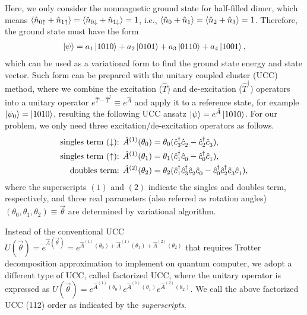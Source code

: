 Here, we only consider the nonmagnetic ground state for half-filled dimer, which means $\langle \hat{n}_{0{\uparrow}}+\hat{n}_{1{\uparrow}} \rangle = \langle \hat{n}_{0{\downarrow}}+\hat{n}_{1{\downarrow}} \rangle = 1$, i.e., $\langle \hat{n}_{0}+\hat{n}_{1} \rangle = \langle \hat{n}_{2}+\hat{n}_{3} \rangle = 1$. Therefore, the ground state must have the form
\begin{align*}
  \left\vert{\psi}\right\rangle = a_{1}\left\vert{1010}\right\rangle + a_{2}\left\vert{0101}\right\rangle + a_{3}\left\vert{0110}\right\rangle + a_{4}\left\vert{1001}\right\rangle,
\end{align*}
which can be used as a variational form to find the ground state energy and state vector. Such form can be prepared with the unitary coupled cluster (UCC) method, where we combine the excitation ($\hat{T}$) and de-excitation ($\hat{T}^\dagger$) operators into a unitary operator $e^{\hat{T} - \hat{T}^\dagger} \equiv e^{\hat{A}}$ and apply it to a reference state, for example $\left\vert{\psi_0}\right\rangle = \left\vert{1010}\right\rangle$, resulting the following UCC ansatz $\left\vert{\psi}\right\rangle = e^{\hat{A}}\left\vert{1010}\right\rangle$. For our problem, we only need three excitation/de-excitation operators as follows.
\begin{align*}
  \text{singles term (${\downarrow}$): }
    & \hat{A}^{(1)}(\theta_0) = \theta_0(
    \hat{c}_{3}^{\dagger}\hat{c}_{2}^{\phantom{\dagger}} -
    \hat{c}_{2}^{\dagger}\hat{c}_{3}^{\phantom{\dagger}} ), \\
  \text{singles term (${\uparrow}$): }
    & \hat{A}^{(1)}(\theta_1) = \theta_1(
    \hat{c}_{1}^{\dagger}\hat{c}_{0}^{\phantom{\dagger}} -
    \hat{c}_{0}^{\dagger}\hat{c}_{1}^{\phantom{\dagger}} ), \\    
  \text{doubles term: }
    & \hat{A}^{(2)}(\theta_2) = \theta_2(
    \hat{c}_{1}^{\dagger}\hat{c}_{3}^{\dagger}\hat{c}_{2}^{\phantom{\dagger}}\hat{c}_{0}^{\phantom{\dagger}} -
    \hat{c}_{0}^{\dagger}\hat{c}_{2}^{\dagger}\hat{c}_{3}^{\phantom{\dagger}}\hat{c}_{1}^{\phantom{\dagger}}),
\end{align*}
where the superscripts $(1)$ and $(2)$ indicate the singles and doubles term, respectively, and three real parameters (also referred as rotation angles) $(\theta_0, \theta_1, \theta_2) \equiv \vec{\theta}$ are determined by variational algorithm.

Instead of the conventional UCC $U(\vec{\theta}) = e^{\hat{A}(\vec{\theta})} = e^{\hat{A}^{(1)}(\theta_0)  + \hat{A}^{(1)}(\theta_1)  + \hat{A}^{(2)}(\theta_2)}$ that requires Trotter decomposition approximation to implement on quantum computer, we adopt a different type of UCC, called factorized UCC, where the unitary operator is expressed as $U(\vec{\theta}) = e^{\hat{A}^{(1)}(\theta_0)} e^{\hat{A}^{(1)}(\theta_1)} e^{\hat{A}^{(2)}(\theta_2)}$. We call the above factorized UCC (112) order as indicated by the \emph{superscripts}.

